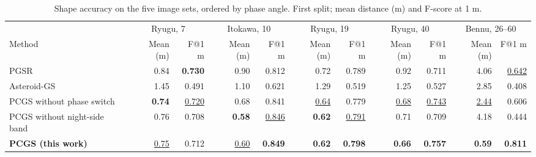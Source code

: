 \begin{table}[t]
\centering
\caption{Shape accuracy on the five image sets, ordered by phase angle. First split; mean distance (m) and F-score at 1 m.}
\label{tab:phase}
\footnotesize
\setlength{\tabcolsep}{2.0pt}
\begin{tabular}{@{}lrrrrrrrrrr@{}}
\toprule
 & \multicolumn{2}{c}{Ryugu, 7\textdegree{}} & \multicolumn{2}{c}{Itokawa, 10\textdegree{}} & \multicolumn{2}{c}{Ryugu, 19\textdegree{}} & \multicolumn{2}{c}{Ryugu, 40\textdegree{}} & \multicolumn{2}{c}{Bennu, 26--60\textdegree{}} \\
\cmidrule(lr){2-3}\cmidrule(lr){4-5}\cmidrule(lr){6-7}\cmidrule(lr){8-9}\cmidrule(lr){10-11}
Method & Mean (m) & F@1 m & Mean (m) & F@1 m & Mean (m) & F@1 m & Mean (m) & F@1 m & Mean (m) & F@1 m \\
\midrule
PGSR & 0.84 & \textbf{0.730} & 0.90 & 0.812 & 0.72 & 0.789 & 0.92 & 0.711 & 4.06 & \underline{0.642} \\
Asteroid-GS & 1.45 & 0.491 & 1.10 & 0.621 & 1.29 & 0.519 & 1.25 & 0.527 & 2.85 & 0.408 \\
PCGS without phase switch & \textbf{0.74} & \underline{0.720} & 0.68 & 0.841 & \underline{0.64} & 0.779 & \underline{0.68} & \underline{0.743} & \underline{2.44} & 0.606 \\
PCGS without night-side band & 0.76 & 0.708 & \textbf{0.58} & \underline{0.846} & \textbf{0.62} & \underline{0.791} & 0.71 & 0.709 & 4.18 & 0.444 \\
\textbf{PCGS (this work)} & \underline{0.75} & 0.712 & \underline{0.60} & \textbf{0.849} & \textbf{0.62} & \textbf{0.798} & \textbf{0.66} & \textbf{0.757} & \textbf{0.59} & \textbf{0.811} \\
\bottomrule
\end{tabular}
\end{table}
